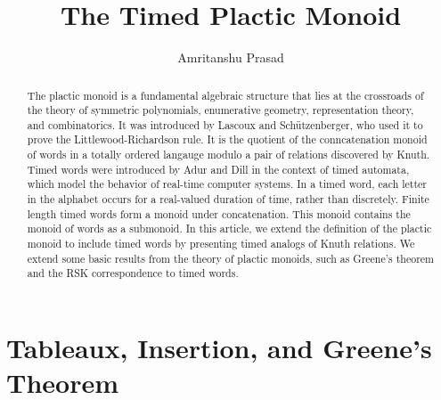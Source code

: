 \documentclass[12pt]{amsart}
\title{The Timed Plactic Monoid}
\author{Amritanshu Prasad}
\theoremstyle{definition}
\begin{document}
\maketitle
\begin{abstract}
  The plactic monoid is a fundamental algebraic structure that lies at the crossroads of the theory of symmetric polynomials, enumerative geometry, representation theory, and combinatorics.
  It was introduced by Lascoux and Sch\"utzenberger, who used it to prove the Littlewood-Richardson rule.
  It is the quotient of the conncatenation monoid of words in a totally ordered langauge modulo a pair of relations discovered by Knuth.
  Timed words were introduced by Adur and Dill in the context of timed automata, which model the behavior of real-time computer systems.
  In a timed word, each letter in the alphabet occurs for a real-valued duration of time, rather than discretely.
  Finite length timed words form a monoid under concatenation.
  This monoid contains the monoid of words as a submonoid.
  In this article, we extend the definition of the plactic monoid to include timed words by presenting timed analogs of Knuth relations.
  We extend some basic results from the theory of plactic monoids, such as Greene's theorem and the RSK correspondence to timed words.
\end{abstract}
\section{Tableaux, Insertion, and Greene's Theorem}
\label{sec:tabl-insert-green}
\end{document}
